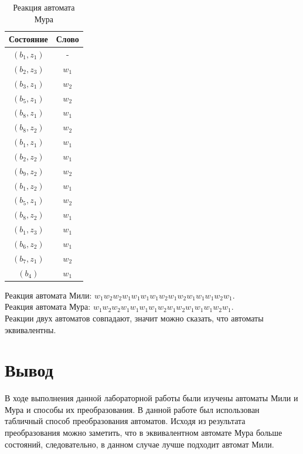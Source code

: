         \begin{table}[!h]
        \centering
            \begin{tabular}{|c|c|}
                \hline
                Состояние   & Слово \\ \hline
                $(b_1,z_1)$ & -     \\ \hline
                $(b_2,z_3)$ & $w_1$ \\ \hline
                $(b_3,z_1)$ & $w_2$ \\ \hline
                $(b_5,z_1)$ & $w_2$ \\ \hline
                $(b_8,z_1)$ & $w_1$ \\ \hline
                $(b_8,z_2)$ & $w_2$ \\ \hline
                $(b_1,z_1)$ & $w_1$ \\ \hline
                $(b_2,z_2)$ & $w_1$ \\ \hline
                $(b_9,z_2)$ & $w_2$ \\ \hline
                $(b_1,z_2)$ & $w_1$ \\ \hline
                $(b_5,z_1)$ & $w_2$ \\ \hline
                $(b_8,z_2)$ & $w_1$ \\ \hline
                $(b_1,z_3)$ & $w_1$ \\ \hline
                $(b_6,z_2)$ & $w_1$ \\ \hline
                $(b_7,z_1)$ & $w_2$ \\ \hline
                $(b_4)$     & $w_1$ \\ \hline
            \end{tabular}
            \caption{Реакция автомата Мура}
        \end{table}


        Реакция автомата Мили: $w_1w_2 w_2 w_1 w_1 w_1 w_1 w_2 w_1 w_2 w_1 w_1 w_1 w_2 w_1$. \\
        Реакция автомата Мура: $w_1w_2 w_2 w_1 w_1 w_1 w_1 w_2 w_1 w_2 w_1 w_1 w_1 w_2 w_1$. \\
		Реакции двух автоматов совпадают, значит можно сказать, что автоматы
		эквивалентны.


\section{Вывод}
В ходе выполнения данной лабораторной работы были изучены автоматы Мили и Мура
и способы их преобразования.
В данной работе был использован табличный способ преобразования автоматов.
Исходя из результата преобразования можно заметить, что в эквивалентном автомате
Мура больше состояний, следовательно, в данном случае лучше подходит автомат Мили.


